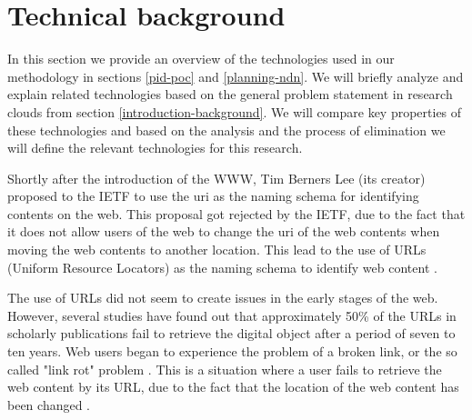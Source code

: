 \section{Technical background}

\label{tech-oview}

In this section we provide an overview of the technologies used in our methodology in sections \ref{pid-poc} and \ref{planning-ndn}. We will briefly analyze and explain related technologies based on the general problem statement in research clouds from section \ref{introduction-background}. We will compare key properties of these technologies and based on the analysis and the process of elimination we will define the relevant technologies for this research.

\label{pid-intr}
Shortly after the introduction of the WWW, Tim Berners Lee (its creator) proposed to the IETF to use the \gls{uri} as the naming schema for identifying contents on the web. This proposal got rejected by the IETF, due to the fact that it does not allow users of the web to change the \gls{uri} of the web contents when moving the web contents to another location. This lead to the use of URLs (Uniform Resource Locators) as the naming schema to identify web content \cite{icn-bd}. 
 
The use of URLs did not seem to create issues in the early stages of the web. However, several studies have found out that approximately 50\% of the URLs  in scholarly publications fail to retrieve the digital object after a period of seven to ten years. Web users began to experience the problem of a broken link, or the so called "link rot" problem \cite{rot-link1, rot-link2}. This is a situation where a user fails to retrieve the web content by its URL, due to the fact that the location of the web content has been changed \cite{icn-bd, ark-id}. 


